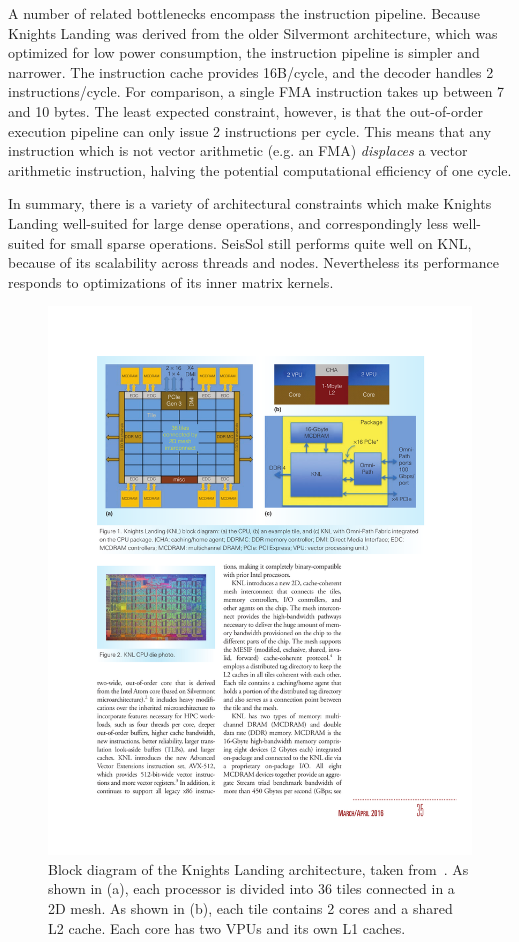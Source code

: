 A number of related bottlenecks encompass the instruction pipeline. Because Knights Landing was derived from the older Silvermont architecture, which was optimized for low power consumption, the instruction pipeline is simpler and narrower. The instruction cache provides 16B/cycle, and the decoder handles 2 instructions/cycle. For comparison, a single \gls{FMA} instruction takes up between 7 and 10 bytes. The least expected constraint, however, is that the out-of-order execution pipeline can only issue 2 instructions per cycle. This means that any instruction which is not vector arithmetic (e.g. an FMA) \emph{displaces} a vector arithmetic instruction, halving the potential computational efficiency of one cycle.

In summary, there is a variety of architectural constraints which make Knights Landing well-suited for large dense operations, and correspondingly less well-suited for small sparse operations. SeisSol still performs quite well on KNL, because of its scalability across threads and nodes.\cite{10.1007/978-3-319-41321-1_18}
 Nevertheless its performance responds to optimizations of its inner matrix kernels.

\begin{figure}[tb]
\centering
\includegraphics[width=\textwidth]{images/knl_arch.pdf}
\caption{Block diagram of the Knights Landing architecture, taken from~\cite{Sodani:2016:KLS:2927511.2927563}. As shown in (a), each processor is divided into 36 tiles connected in a 2D mesh. As shown in (b), each tile contains 2 cores and a shared L2 cache. Each core has two VPUs and its own L1 caches.}
\end{figure}


